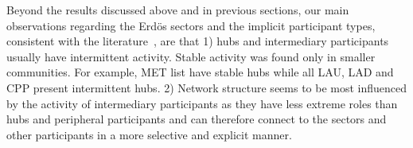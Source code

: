 \documentclass[%
	aip,
	jmp,%
	amsmath,amssymb,
	reprint,%
]{revtex4-1}
\begin{document}
Beyond the results discussed above and in previous sections,
our main observations regarding the Erd\"os sectors
and the implicit participant types,
consistent with the literature~\cite{barabasiEvo},
are that
1) hubs and intermediary participants usually have intermittent activity.
Stable activity was found only in smaller communities.
For example, MET list have stable hubs while all LAU, LAD and CPP
present intermittent hubs.
2) Network structure seems to be most influenced by the
activity of intermediary participants as they have less extreme
roles than hubs and peripheral participants and
can therefore connect to the sectors and other participants 
in a more selective and explicit manner.







%
%
%
\end{document}
